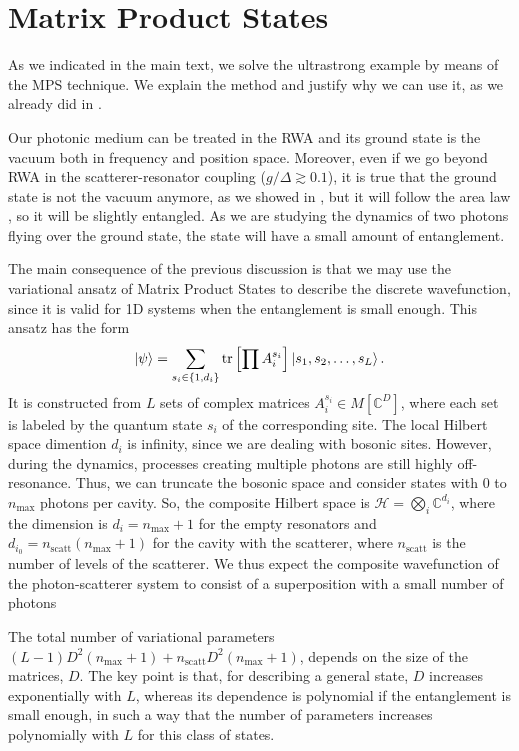 \documentclass[notitlepage, prx, preprint, amsmath,superscriptaddress,amssymb]{revtex4-1}
\begin{document}
\section{Matrix Product States}

As we indicated in the main text, we solve the ultrastrong example by means of the MPS technique. We explain the method and justify why we can use it, as we already did in \cite{Sanchez-Burillo2014,Sanchez-Burillo2015,Sanchez-Burillo2016a}.

Our photonic medium can be treated in the RWA and its ground state is the vacuum both in frequency and position space. Moreover, even if we go beyond RWA in the scatterer-resonator coupling ($g/\Delta\gtrsim 0.1$), it is true that the ground state is not the vacuum anymore, as we showed in \cite{Sanchez-Burillo2014}, but it will follow the area law \cite{Eisert2010}, so it will be slightly entangled. As we are studying the dynamics of two photons flying over the ground state, the state will have a small amount of entanglement.

The main consequence of the previous discussion is that we may use the variational ansatz of Matrix Product States \cite{Ripoll2006,Verstraete2008} to describe the discrete wavefunction, since it is valid for 1D systems when the entanglement is small enough. This ansatz has the form
\begin{equation}
\ket{\psi} = \sum_{s_i \in \{1,d_i\}} \mathrm{tr}\left[
\prod A_i^{s_i}\right] \ket{s_1,s_2,\ldots,s_L}.
\label{eq:mps}
\end{equation}
It is constructed from $L$ sets of complex matrices $A_i^{s_i} \in M[\mathbb{C}^{D}]$, where each set is labeled by the quantum state $s_i$ of the corresponding site. The local Hilbert space dimention $d_i$ is infinity, since we are dealing with bosonic sites. However, during the dynamics, processes creating multiple photons are still highly off-resonance. Thus, we can truncate the bosonic space and consider states with $0$ to
$n_\text{max}$ photons per cavity. So, the composite Hilbert space is $\mathcal{H}=\bigotimes_i \mathbb{C}^{d_i}$, where the dimension is $d_i=n_\text{max}+1$ for the empty resonators and $d_{i_0}=n_\text{scatt}(n_\text{max}+1)$ for the cavity with the scatterer, where $n_\text{scatt}$ is the number of levels of the scatterer. We thus expect the composite wavefunction of the photon-scatterer system to consist of a superposition with a small number of photons

The total number of variational parameters $(L-1)D^2(n_\text{max}+1) + n_\text{scatt}D^2(n_\text{max}+1)$, depends on the size of the matrices, $D$. The key point is that, for describing a general state, $D$ increases exponentially with $L$, whereas its dependence is polynomial if the entanglement is small enough, in such a way that the number of parameters increases polynomially with $L$ for this class of states.
\end{document}
